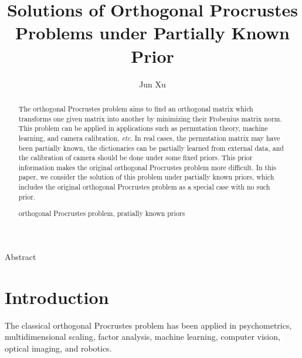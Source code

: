 \documentclass[titlepage,11pt,twoside]{article}
\begin{document}

\title{Solutions of Orthogonal Procrustes Problems under Partially Known  Prior}

\author{Jun Xu }






\begin{center}\vskip3pt


\vspace{32pt}

Abstract\vskip3pt

\end{center}


\begin{abstract}
The orthogonal Procrustes problem aims to find an orthogonal matrix which transforms one given matrix into another by minimizing their Frobenius matrix norm. This problem can be applied in applications such as permutation theory, machine learning, and camera calibration, \emph{etc}. In real cases, the permutation matrix may have been partially known, the dictionaries can be partially learned from external data, and the calibration of camera should be done under some fixed priors. This prior information makes the original orthogonal Procrustes problem more difficult. In this paper, we consider the solution of this problem under partially known priors, which includes the original orthogonal Procrustes problem as a special case with no such prior.
\begin{keywords}
orthogonal Procrustes problem, pratially known priors
\end{keywords}
\end{abstract}

\vspace{\fill}\newpage

\section{Introduction}
The classical orthogonal Procrustes problem has been applied in psychometrics, multidimensional scaling, factor analysis, machine learning, computer vision, optical imaging, and robotics.
\end{document}
